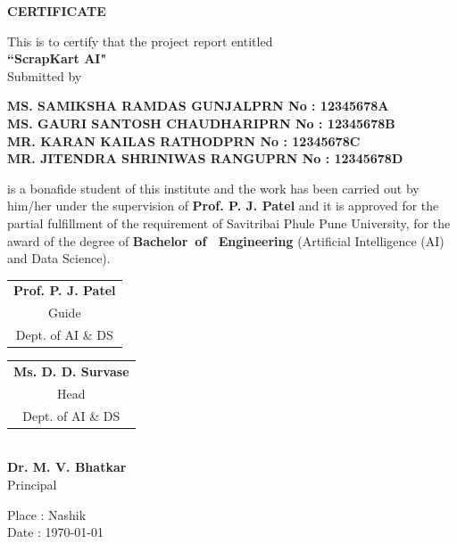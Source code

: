 \cleardoublepage
\thispagestyle{empty}
\begin{center}
    \textbf{\LARGE  CERTIFICATE \\ [0.2cm]}
\end{center}
\vspace{1cm}

{\centering This is to certify that the project report entitled\\[0.2cm]
 {\large \textbf{``ScrapKart AI"}}\\[0.3cm]
 Submitted by\\[0.2cm]}
 
\begin{center}
    {\normalsize \textbf{MS. SAMIKSHA RAMDAS GUNJAL}}\hfill {\normalsize \textbf{PRN No : 12345678A }}\\
    {\normalsize \textbf{MS. GAURI SANTOSH CHAUDHARI}}\hfill {\normalsize \textbf{PRN No : 12345678B }}\\
    {\normalsize \textbf{MR. KARAN KAILAS RATHOD}}\hfill {\normalsize \textbf{PRN No : 12345678C }}\\
     {\normalsize \textbf{MR. JITENDRA SHRINIWAS RANGU}}\hfill {\normalsize \textbf{PRN No : 12345678D }}\\
  \end{center}   
 is a bonafide student of this institute and the work has been carried out by him/her under the supervision of \textbf{ Prof. P. J. Patel }and it is approved for the partial fulfillment of the requirement of Savitribai Phule Pune University, for the award of the degree of \textbf{Bachelor~of ~Engineering} (Artificial Intelligence (AI) and Data Science).

\vspace{1.5cm}
\begin{center}
\noindent \begin{tabular}{c}
\textbf{Prof. P. J. Patel} \\
Guide \\
Dept. of AI \& DS
\end{tabular}
\hfill
\begin{tabular}{c}
\textbf{Ms. D. D. Survase }\\
Head \\
Dept. of AI \& DS
\end{tabular}\\[1cm]
\textbf{Dr. M. V. Bhatkar}\\
Principal\\[1cm]
\end{center}
Place : Nashik\\
Date : \today

